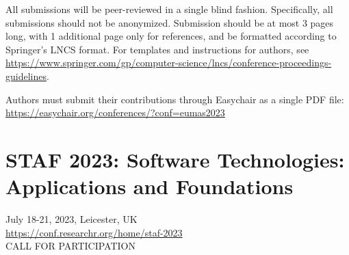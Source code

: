\documentclass[prodmode,acmtecs]{acmsmall} %
\begin{document}
\begin{itemize}
  All submissions will be peer-reviewed in a single blind fashion. Specifically, all submissions should not be anonymized. Submission should be at most 3 pages long, with 1 additional page only for references, and be formatted according to Springer’s LNCS format. For templates and instructions for authors, see \href{https://www.springer.com/gp/computer-science/lncs/conference-proceedings-guidelines}{https://www.springer.com/gp/computer-science/lncs/conference-proceedings-guidelines}. 
 
  Authors must submit their contributions through Easychair as a single PDF file: \href{https://easychair.org/conferences/?conf=eumas2023}{https://easychair.org/conferences/?conf=eumas2023}   
 
\end{itemize}\section{STAF 2023: Software Technologies: Applications and Foundations}\label{STAF2023}  July 18-21, 2023, Leicester, UK\\ 
  \href{https://conf.researchr.org/home/staf-2023}{https://conf.researchr.org/home/staf-2023}\\ 
CALL FOR PARTICIPATION 
\end{document}
